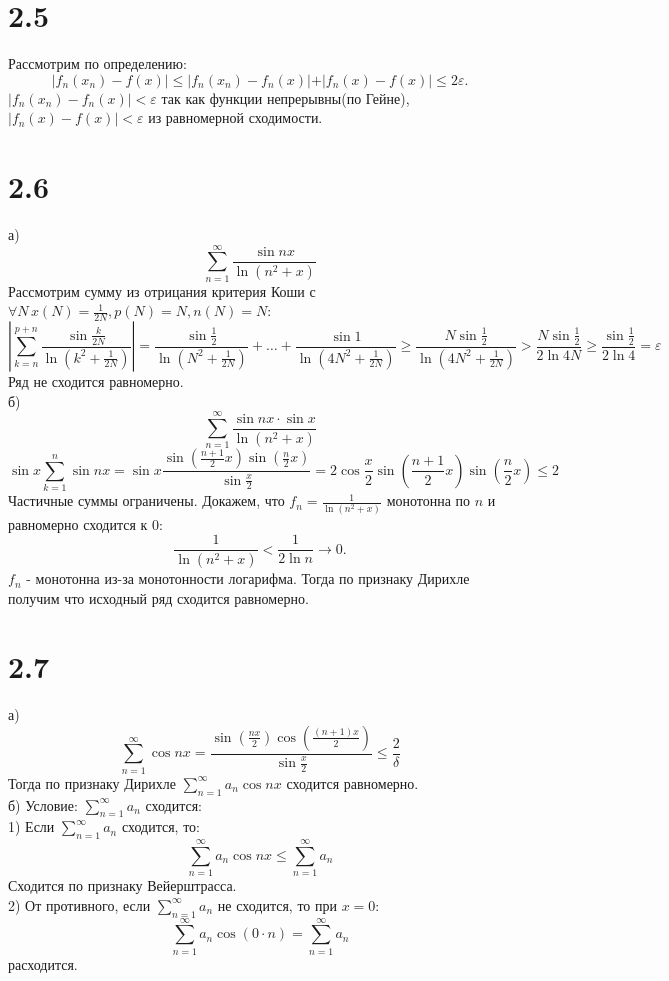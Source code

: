 \documentclass[12pt]{article}
\begin{document}
\section{2.5}
Рассмотрим по определению: 
\[
    \vert f_n(x_n) - f(x) \vert \leq  
    \vert f_n(x_n) - f_n(x) \vert + \vert f_n(x) - f(x) \vert \leq 2 \varepsilon.
\]
$\vert f_n(x_n) - f_n(x) \vert < \varepsilon $ так как функции непрерывны(по Гейне), 
$\vert f_n(x) - f(x) \vert < \varepsilon $ из равномерной сходимости.
\section{2.6}
а)
\[
    \sum_{n=1}^{\infty} \frac{\sin nx}{\ln (n^2 + x)}
\]
Рассмотрим сумму из отрицания критерия Коши с $\forall N \, x(N) = \frac{1}{2N}, p(N) = N, n(N) = N$:
\[
    \left| \sum_{k=n}^{p + n} \frac{\sin \frac{k}{2N}}{\ln (k^2 + \frac{1}{2N})} \right| = 
    \frac{\sin \frac{1}{2}}{\ln (N^2 + \frac{1}{2N})} + \dots + \frac{\sin 1}{\ln (4N^2 + \frac{1}{2N})} \geq 
    \frac{N \sin \frac{1}{2}}{\ln (4N^2 + \frac{1}{2N})} > \frac{N \sin \frac{1}{2}}{2 \ln 4N} \geq \frac{\sin \frac{1}{2}}{2\ln 4} = \varepsilon 
\] 
Ряд не сходится равномерно.\\
б)
\[
    \sum_{n=1}^{\infty} \frac{\sin nx \cdot \sin x}{\ln (n^2 + x)}
\]
\[
    \sin x \sum_{k=1}^{n} \sin nx = \sin x \frac{\sin \left( \frac{n+1}{2} x \right) \sin \left( \frac{n}{2}x \right) }{\sin \frac{x}{2}} = 
    2 \cos \frac{x}{2} \sin \left( \frac{n+1}{2} x \right) \sin \left( \frac{n}{2}x \right) \leq 2
\]
Частичные суммы ограничены. Докажем, что $f_n = \frac{1}{\ln (n^2 + x)}$
монотонна по $n$ и равномерно сходится к $0$:
\[
    \frac{1}{\ln (n^2 + x)} < \frac{1}{2 \ln n} \to 0.
\]
$f_n$ - монотонна из-за монотонности логарифма. 
Тогда по признаку Дирихле получим что исходный ряд сходится равномерно.
\section{2.7}
а) 
\[
    \sum_{n=1}^{\infty} \cos nx = \frac{\sin \left( \frac{nx}{2} \right)  \cos \left( \frac{(n+1)x}{2} \right) }{\sin \frac{x}{2}} \leq \frac{2}{\delta}
\]
Тогда по признаку Дирихле $\sum_{n=1}^{\infty} a_n \cos nx$ сходится равномерно. \\
б) 
Условие: $\sum_{n=1}^{\infty} a_n$ сходится: \\
1) Если $\sum_{n=1}^{\infty} a_n$ сходится, то: 
\[
    \sum_{n=1}^{\infty} a_n \cos nx \leq \sum_{n=1}^{\infty} a_n
\]
Сходится по признаку Вейерштрасса. \\
2) От противного, если $\sum_{n=1}^{\infty} a_n$ не сходится, то при $x = 0$: 
\[
    \sum_{n=1}^{\infty} a_n \cos (0 \cdot n) = \sum_{n=1}^{\infty} a_n
\]
расходится.
\end{document}

